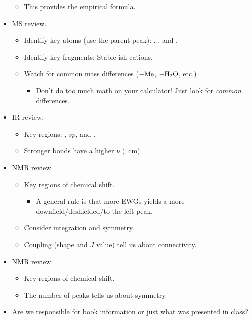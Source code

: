 \documentclass[../notes.tex]{subfiles}
\begin{document}
\begin{itemize}
\begin{itemize}
        \item This provides the empirical formula.
    \end{itemize}
    \item MS review.
    \begin{itemize}
        \item Identify key atoms (use the parent peak): , , and .
        \item Identify key fragments: Stable-ish cations.
        \item Watch for common mass differences ($-\ce{Me}$, $-\ce{H2O}$, etc.)
        \begin{itemize}
            \item Don't do too much math on your calculator! Just look for \emph{common} differences.
        \end{itemize}
    \end{itemize}
    \item IR review.
    \begin{itemize}
        \item Key regions: , $sp$, and .
        \item Stronger bonds have a higher $\nu$ (\si{\per\centi\meter}).
    \end{itemize}
    \item {} NMR review.
    \begin{itemize}
        \item Key regions of chemical shift.
        \begin{itemize}
            \item A general rule is that more EWGs yields a more downfield/deshielded/to the left peak.
        \end{itemize}
        \item Consider integration and symmetry.
        \item Coupling (shape and $J$ value) tell us about connectivity.
    \end{itemize}
    \item {} NMR review.
    \begin{itemize}
        \item Key regions of chemical shift.
        \item The number of peaks tells us about symmetry.
    \end{itemize}
    \item Are we responsible for book information or just what was presented in class?
    \begin{itemize}

\end{itemize}
\end{itemize}
\end{document}
